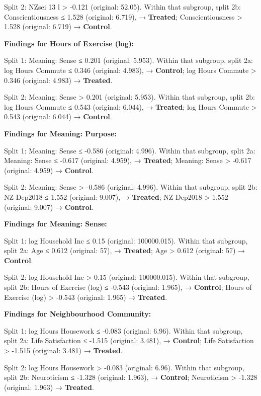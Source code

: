 \documentclass[
  single column]{article}
\begin{document}
Split 2: NZsei 13 l \textgreater{} -0.121 (original: 52.05). Within that
subgroup, split 2b: Conscientiousness ≤ 1.528 (original: 6.719), →
\textbf{Treated}; Conscientiousness \textgreater{} 1.528 (original:
6.719) → \textbf{Control}.

\textbf{Findings for Hours of Exercise (log):}

Split 1: Meaning: Sense ≤ 0.201 (original: 5.953). Within that subgroup,
split 2a: log Hours Commute ≤ 0.346 (original: 4.983), →
\textbf{Control}; log Hours Commute \textgreater{} 0.346 (original:
4.983) → \textbf{Treated}.

Split 2: Meaning: Sense \textgreater{} 0.201 (original: 5.953). Within
that subgroup, split 2b: log Hours Commute ≤ 0.543 (original: 6.044), →
\textbf{Treated}; log Hours Commute \textgreater{} 0.543 (original:
6.044) → \textbf{Control}.

\textbf{Findings for Meaning: Purpose:}

Split 1: Meaning: Sense ≤ -0.586 (original: 4.996). Within that
subgroup, split 2a: Meaning: Sense ≤ -0.617 (original: 4.959), →
\textbf{Treated}; Meaning: Sense \textgreater{} -0.617 (original: 4.959)
→ \textbf{Control}.

Split 2: Meaning: Sense \textgreater{} -0.586 (original: 4.996). Within
that subgroup, split 2b: NZ Dep2018 ≤ 1.552 (original: 9.007), →
\textbf{Treated}; NZ Dep2018 \textgreater{} 1.552 (original: 9.007) →
\textbf{Control}.

\textbf{Findings for Meaning: Sense:}

Split 1: log Household Inc ≤ 0.15 (original: 100000.015). Within that
subgroup, split 2a: Age ≤ 0.612 (original: 57), → \textbf{Treated}; Age
\textgreater{} 0.612 (original: 57) → \textbf{Control}.

Split 2: log Household Inc \textgreater{} 0.15 (original: 100000.015).
Within that subgroup, split 2b: Hours of Exercise (log) ≤ -0.543
(original: 1.965), → \textbf{Control}; Hours of Exercise (log)
\textgreater{} -0.543 (original: 1.965) → \textbf{Treated}.

\textbf{Findings for Neighbourhood Community:}

Split 1: log Hours Housework ≤ -0.083 (original: 6.96). Within that
subgroup, split 2a: Life Satisfaction ≤ -1.515 (original: 3.481), →
\textbf{Control}; Life Satisfaction \textgreater{} -1.515 (original:
3.481) → \textbf{Treated}.

Split 2: log Hours Housework \textgreater{} -0.083 (original: 6.96).
Within that subgroup, split 2b: Neuroticism ≤ -1.328 (original: 1.963),
→ \textbf{Control}; Neuroticism \textgreater{} -1.328 (original: 1.963)
→ \textbf{Treated}.
\end{document}
